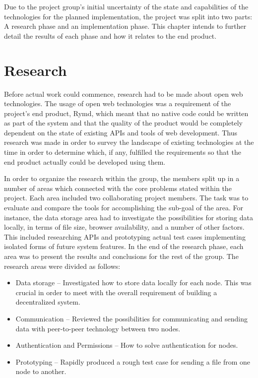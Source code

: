 Due to the project group's initial uncertainty of the state and capabilities of the technologies for the planned implementation, the project was split into two parts: A research phase and an implementation phase. This chapter intends to further detail the results of each phase and how it relates to the end product.

\section{Research}

Before actual work could commence, research had to be made about open web technologies. The usage of open web technologies was a requirement of the project's end product, Rymd, which meant that no native code could be written as part of the system and that the quality of the product would be completely dependent on the state of existing APIs and tools of web development. Thus research was made in order to survey the landscape of existing technologies at the time in order to determine which, if any, fulfilled the requirements so that the end product actually could be developed using them.

In order to organize the research within the group, the members split up in a number of areas which connected with the core problems stated within the project. Each area included two collaborating project members. The task was to evaluate and compare the tools for accomplishing the sub-goal of the area. For instance, the data storage area had to investigate the possibilities for storing data locally, in terms of file size, browser availability, and a number of other factors. This included researching APIs and prototyping actual test cases implementing isolated forms of future system features. In the end of the research phase, each area was to present the results and conclusions for the rest of the group. The research areas were divided as follows:

\begin{itemize}
\item Data storage – Investigated how to store data locally for each node. This was crucial in order to meet with the overall requirement of building a decentralized system.
\item Communication – Reviewed the possibilities for communicating and sending data with peer-to-peer technology between two nodes.
\item Authentication and Permissions – How to solve authentication for nodes.
  \item Prototyping – Rapidly produced a rough test case for sending a file from one node to another.
\end{itemize}

